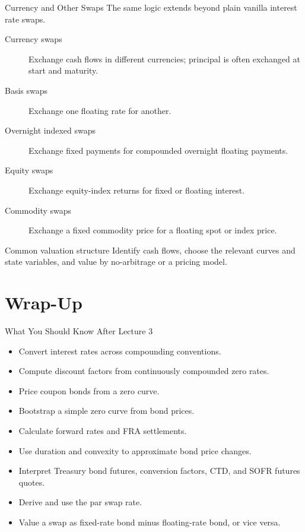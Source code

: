 \documentclass[aspectratio=169,11pt]{beamer}
\begin{document}
\begin{frame}{Currency and Other Swaps}
    The same logic extends beyond plain vanilla interest rate swaps.

    \begin{description}
        \item[Currency swaps] Exchange cash flows in different currencies; principal is often exchanged at start and maturity.
        \item[Basis swaps] Exchange one floating rate for another.
        \item[Overnight indexed swaps] Exchange fixed payments for compounded overnight floating payments.
        \item[Equity swaps] Exchange equity-index returns for fixed or floating interest.
        \item[Commodity swaps] Exchange a fixed commodity price for a floating spot or index price.
    \end{description}

    \begin{block}{Common valuation structure}
        Identify cash flows, choose the relevant curves and state variables, and value by no-arbitrage or a pricing model.
    \end{block}
\end{frame}

\section{Wrap-Up}

\begin{frame}{What You Should Know After Lecture 3}
    \begin{itemize}
        \item Convert interest rates across compounding conventions.
        \item Compute discount factors from continuously compounded zero rates.
        \item Price coupon bonds from a zero curve.
        \item Bootstrap a simple zero curve from bond prices.
        \item Calculate forward rates and FRA settlements.
        \item Use duration and convexity to approximate bond price changes.
        \item Interpret Treasury bond futures, conversion factors, CTD, and SOFR futures quotes.
        \item Derive and use the par swap rate.
        \item Value a swap as fixed-rate bond minus floating-rate bond, or vice versa.
    \end{itemize}
\end{frame}
\end{document}
